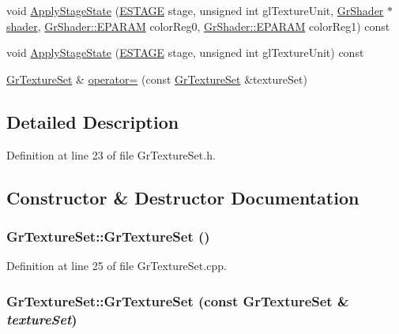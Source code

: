 \begin{CompactItemize}
\item 
void \hyperlink{class_gr_texture_set_e3e1bfc4506ef8333d5ef947f8d7b391}{ApplyStageState} (\hyperlink{_gr_config_8h_6df36e6af6bdeed00ff250f968160688}{ESTAGE} stage, unsigned int glTextureUnit, \hyperlink{class_gr_shader}{GrShader} $\ast$\hyperlink{glext_8h_57b2a96adb1d51204909a82d861e395e}{shader}, \hyperlink{class_gr_shader_2f004c603bb97711d05eb68381a5a7ba}{GrShader::EPARAM} colorReg0, \hyperlink{class_gr_shader_2f004c603bb97711d05eb68381a5a7ba}{GrShader::EPARAM} colorReg1) const 
\item 
void \hyperlink{class_gr_texture_set_32fe958b51b47d431ee66cd72702a40e}{ApplyStageState} (\hyperlink{_gr_config_8h_6df36e6af6bdeed00ff250f968160688}{ESTAGE} stage, unsigned int glTextureUnit) const 
\item 
\hyperlink{class_gr_texture_set}{GrTextureSet} \& \hyperlink{class_gr_texture_set_b74061702d1fc9d62f04e93638530df9}{operator=} (const \hyperlink{class_gr_texture_set}{GrTextureSet} \&textureSet)
\end{CompactItemize}


\subsection{Detailed Description}


Definition at line 23 of file GrTextureSet.h.

\subsection{Constructor \& Destructor Documentation}
\hypertarget{class_gr_texture_set_af1ff98047184f4b7f063e6d7e0b2b12}{
\subsubsection[{GrTextureSet}]{\setlength{\rightskip}{0pt plus 5cm}GrTextureSet::GrTextureSet ()}}
\label{class_gr_texture_set_af1ff98047184f4b7f063e6d7e0b2b12}




Definition at line 25 of file GrTextureSet.cpp.\hypertarget{class_gr_texture_set_080b55aca308912bb5b65b317d4d234a}{
\subsubsection[{GrTextureSet}]{\setlength{\rightskip}{0pt plus 5cm}GrTextureSet::GrTextureSet (const {\bf GrTextureSet} \& {\em textureSet})}}
\label{class_gr_texture_set_080b55aca308912bb5b65b317d4d234a}




